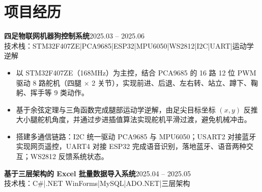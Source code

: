 \documentclass[10pt,a4paper]{article}
\newcommand{\projectblock}[3]{%
    {\bfseries\color{darktext}#1}\hfill{\color{graytext}#2}\\%
    {\small\color{graytext}#3}%
    \vspace{0.2em}%
}
\begin{document}
\section{\faProjectDiagram\hspace{0.4em}项目经历}

\projectblock{四足物联网机器狗控制系统}{2025.03 -- 2025.06}{技术栈：STM32F407ZE\hspace{0.3em}|\hspace{0.3em}PCA9685\hspace{0.3em}|\hspace{0.3em}ESP32\hspace{0.3em}|\hspace{0.3em}MPU6050\hspace{0.3em}|\hspace{0.3em}WS2812\hspace{0.3em}|\hspace{0.3em}I2C\hspace{0.3em}|\hspace{0.3em}UART\hspace{0.3em}|\hspace{0.3em}运动学逆解}

\begin{itemize}[leftmargin=1.5em, itemsep=2pt, parsep=0pt, topsep=2pt]
    \item 以 STM32F407ZE（168MHz）为主控，结合 PCA9685 的 16 路 12 位 PWM 驱动 8 路舵机（四腿 $\times$ 2 关节），实现前进、后退、左右转、站立、蹲下、鞠躬、挥手等 9 类动作。
    \item 基于余弦定理与三角函数完成腿部运动学逆解，由足尖目标坐标 $(x, y)$ 反推大小腿舵机角度，并通过步进插值算法实现舵机平滑过渡，避免机械冲击。
    \item 搭建多通信链路：I2C 统一驱动 PCA9685 与 MPU6050；USART2 对接蓝牙实现网页遥控，UART4 对接 ESP32 完成语音识别，落地蓝牙、语音两种交互；WS2812 反馈系统状态。
\end{itemize}

\vspace{0.15em}

\projectblock{基于三层架构的 Excel 批量数据导入系统}{2025.04 -- 2025.05}{技术栈：C\#\hspace{0.3em}|\hspace{0.3em}.NET WinForms\hspace{0.3em}|\hspace{0.3em}MySQL\hspace{0.3em}|\hspace{0.3em}ADO.NET\hspace{0.3em}|\hspace{0.3em}三层架构}
\end{document}
